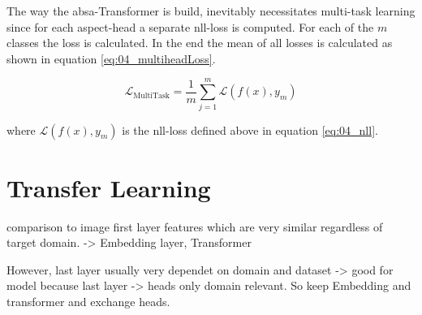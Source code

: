The way the \gls{absa}-Transformer is build, inevitably necessitates multi-task learning since for each aspect-head a separate \gls{nll}-loss is computed. For each of the $m$ classes the loss is calculated. In the end the mean of all losses is calculated as shown in equation \ref{eq:04_multiheadLoss}.

\begin{equation}
\mathcal{L}_\text{MultiTask} = \frac{1}{m}\sum_{j=1}^{m}\mathcal{L}(f(x), y_m)
\label{eq:04_multiheadLoss}
\end{equation}

where $\mathcal{L}(f(x), y_m)$ is the \gls{nll}-loss defined above in equation \ref{eq:04_nll}.

\section{Transfer Learning}

comparison to image first layer features which are very similar regardless of target domain. \cite{Yosinski2014} -> Embedding layer, Transformer

However, last layer usually very dependet on domain and dataset -> good for model because last layer -> heads only domain relevant. So keep Embedding and transformer and exchange heads.

